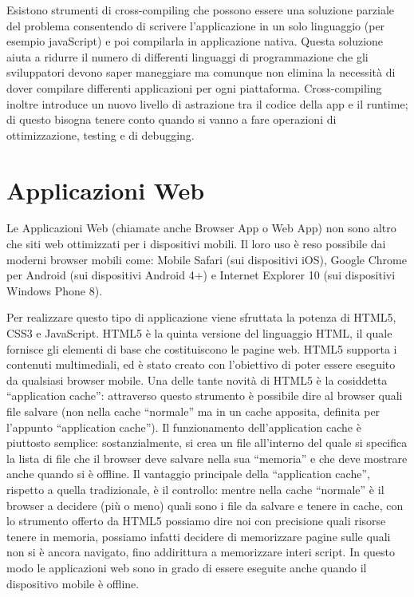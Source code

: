 		Esistono strumenti di cross-compiling che possono essere una soluzione 
		parziale del problema consentendo di scrivere l'applicazione in un solo 
		linguaggio (per esempio javaScript) e poi compilarla in applicazione 
		nativa. Questa soluzione aiuta a ridurre il numero di differenti 
		linguaggi di programmazione che gli sviluppatori devono saper maneggiare 
		ma comunque non elimina la necessità di dover compilare differenti 
		applicazioni per ogni piattaforma. Cross-compiling inoltre introduce un 
		nuovo livello di astrazione tra il codice della app e il runtime; di 
		questo bisogna tenere conto quando si vanno a fare operazioni di 
		ottimizzazione, testing e di debugging.

	\section{Applicazioni Web}
	\label{sec:webapp}
		Le Applicazioni Web (chiamate anche Browser App o Web App) non sono 
		altro che siti web ottimizzati per i dispositivi mobili. Il loro uso è 
		reso possibile dai moderni browser mobili come: Mobile Safari (sui 
		dispositivi iOS), Google Chrome per Android (sui dispositivi Android 4+) 
		e Internet Explorer 10 (sui dispositivi Windows Phone 8).
		
		Per realizzare questo tipo di applicazione viene sfruttata la potenza di 
		HTML5, CSS3 e JavaScript. HTML5 è la quinta versione del linguaggio 
		HTML, il quale fornisce gli elementi di base che costituiscono le pagine 
		web. HTML5 supporta i contenuti multimediali, ed è stato creato con 
		l'obiettivo di poter essere eseguito da qualsiasi browser 
		mobile\citep{White:Native-vs-Html}. Una delle tante novità di HTML5 è la 
		cosiddetta ``application cache'': attraverso questo strumento è 
		possibile dire al browser quali file salvare (non nella cache 
		``normale'' ma in un cache apposita, definita per l'appunto 
		``application cache''). Il funzionamento dell'application cache è 
		piuttosto semplice: sostanzialmente, si crea un file all'interno del 
		quale si specifica la lista di file che il browser deve salvare nella 
		sua ``memoria'' e che deve mostrare anche quando si è offline. Il 
		vantaggio principale della ``application cache'', rispetto a quella 
		tradizionale, è il controllo: mentre nella cache ``normale'' è il 
		browser a decidere (più o meno) quali sono i file da salvare e tenere in 
		cache, con lo strumento offerto da HTML5 possiamo dire noi con 
		precisione quali risorse tenere in memoria, possiamo infatti decidere di 
		memorizzare pagine sulle quali non si è ancora navigato, fino 
		addirittura a memorizzare interi script. In questo modo le applicazioni 
		web sono in grado di essere eseguite anche quando il dispositivo mobile 
		è offline.

